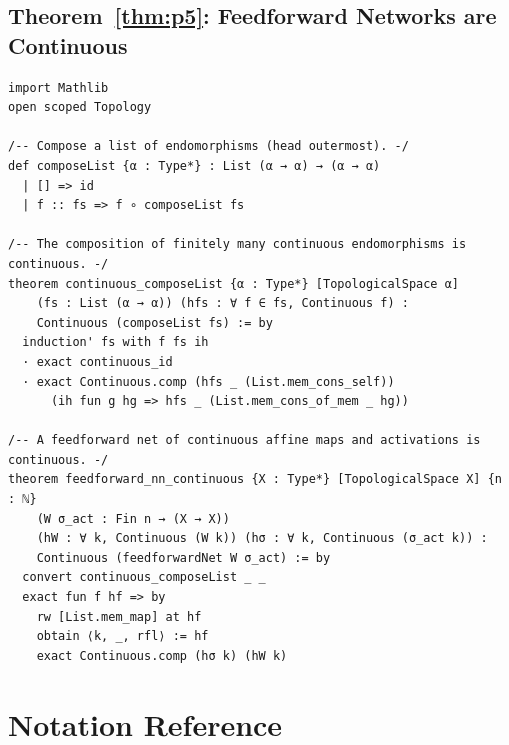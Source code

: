 \documentclass[twoside,11pt]{article}
\begin{document}
\subsection{Theorem~\ref{thm:p5}: Feedforward Networks are Continuous}

\begin{lstlisting}
import Mathlib
open scoped Topology

/-- Compose a list of endomorphisms (head outermost). -/
def composeList {α : Type*} : List (α → α) → (α → α)
  | [] => id
  | f :: fs => f ∘ composeList fs

/-- The composition of finitely many continuous endomorphisms is continuous. -/
theorem continuous_composeList {α : Type*} [TopologicalSpace α]
    (fs : List (α → α)) (hfs : ∀ f ∈ fs, Continuous f) :
    Continuous (composeList fs) := by
  induction' fs with f fs ih
  · exact continuous_id
  · exact Continuous.comp (hfs _ (List.mem_cons_self))
      (ih fun g hg => hfs _ (List.mem_cons_of_mem _ hg))

/-- A feedforward net of continuous affine maps and activations is continuous. -/
theorem feedforward_nn_continuous {X : Type*} [TopologicalSpace X] {n : ℕ}
    (W σ_act : Fin n → (X → X))
    (hW : ∀ k, Continuous (W k)) (hσ : ∀ k, Continuous (σ_act k)) :
    Continuous (feedforwardNet W σ_act) := by
  convert continuous_composeList _ _
  exact fun f hf => by
    rw [List.mem_map] at hf
    obtain ⟨k, _, rfl⟩ := hf
    exact Continuous.comp (hσ k) (hW k)
\end{lstlisting}

\section{Notation Reference}
\label{app:notation}
\end{document}
